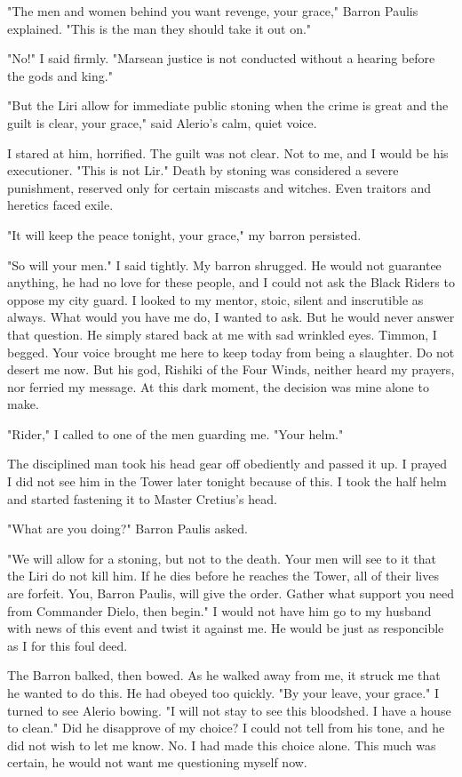 \documentclass{article}
\begin{document}
"The men and women behind you want revenge, your grace," Barron Paulis explained. "This is the man they should take it out on."

"No!" I said firmly. "Marsean justice is not conducted without a hearing before the gods and king."

"But the Liri allow for immediate public stoning when the crime is great and the guilt is clear, your grace," said Alerio's calm, quiet voice.

I stared at him, horrified. The guilt was not clear. Not to me, and I would be his executioner. "This is not Lir." Death by stoning was considered a severe punishment, reserved only for certain miscasts and witches. Even traitors and heretics faced exile.

"It will keep the peace tonight, your grace," my barron persisted.

"So will your men." I said tightly. My barron shrugged. He would not guarantee anything, he had no love for these people, and I could not ask the Black Riders to oppose my city guard. I looked to my mentor, stoic, silent and inscrutible as always. What would you have me do, I wanted to ask. But he would never answer that question. He simply stared back at me with sad wrinkled eyes. Timmon, I begged. Your voice brought me here to keep today from being a slaughter. Do not desert me now. But his god, Rishiki of the Four Winds, neither heard my prayers, nor ferried my message. At this dark moment, the decision was mine alone to make.

"Rider," I called to one of the men guarding me. "Your helm."

The disciplined man took his head gear off obediently and passed it up. I prayed I did not see him in the Tower later tonight because of this. I took the half helm and started fastening it to Master Cretius's head.

"What are you doing?" Barron Paulis asked.

"We will allow for a stoning, but not to the death. Your men will see to it that the Liri do not kill him. If he dies before he reaches the Tower, all of their lives are forfeit. You, Barron Paulis, will give the order. Gather what support you need from Commander Dielo, then begin." I would not have him go to my husband with news of this event and twist it against me. He would be just as responcible as I for this foul deed.

The Barron balked, then bowed. As he walked away from me, it struck me that he wanted to do this. He had obeyed too quickly. "By your leave, your grace." I turned to see Alerio bowing. "I will not stay to see this bloodshed. I have a house to clean." Did he disapprove of my choice? I could not tell from his tone, and he did not wish to let me know. No. I had made this choice alone. This much was certain, he would not want me questioning myself now.
\end{document}

